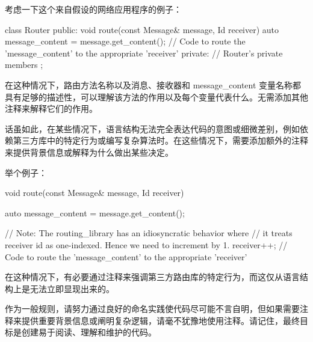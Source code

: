 考虑一下这个来自假设的网络应用程序的例子：

\begin{cpp}
class Router {
public:
    void route(const Message& message, Id receiver) {
        auto message_content = message.get_content();
        // Code to route the 'message_content' to the appropriate 'receiver'
    }
private:
    // Router's private members
};
\end{cpp}

在这种情况下，路由方法名称以及消息、接收器和 message\_content 变量名称都具有足够的描述性，可以理解该方法的作用以及每个变量代表什么。无需添加其他注释来解释它们的作用。

话虽如此，在某些情况下，语言结构无法完全表达代码的意图或细微差别，例如依赖第三方库中的特定行为或编写复杂算法时。在这些情况下，需要添加额外的注释来提供背景信息或解释为什么做出某些决定。

举个例子：

\begin{cpp}
void route(const Message& message, Id receiver) {
    auto message_content = message.get_content();

    // Note: The routing_library has an idiosyncratic behavior where
    // it treats receiver id as one-indexed. Hence we need to
    increment by 1.
    receiver++;
    // Code to route the 'message_content' to the appropriate 'receiver'
}
\end{cpp}

在这种情况下，有必要通过注释来强调第三方路由库的特定行为，而这仅从语言结构上是无法立即显现出来的。

作为一般规则，请努力通过良好的命名实践使代码尽可能不言自明，但如果需要注释来提供重要背景信息或阐明复杂逻辑，请毫不犹豫地使用注释。请记住，最终目标是创建易于阅读、理解和维护的代码。








